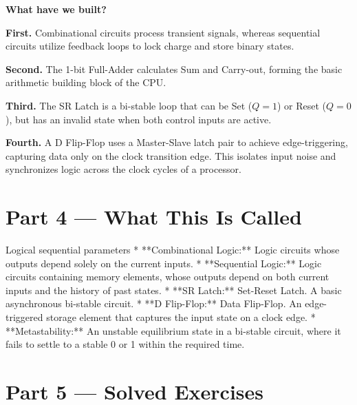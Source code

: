 \documentclass[12pt, a4paper]{book}
\begin{document}
\begin{discoverybox}
\textbf{What have we built?}

\textbf{First.} Combinational circuits process transient signals, whereas sequential circuits utilize feedback loops to lock charge and store binary states.

\textbf{Second.} The 1-bit Full-Adder calculates Sum and Carry-out, forming the basic arithmetic building block of the CPU.

\textbf{Third.} The SR Latch is a bi-stable loop that can be Set ($Q=1$) or Reset ($Q=0$), but has an invalid state when both control inputs are active.

\textbf{Fourth.} A D Flip-Flop uses a Master-Slave latch pair to achieve edge-triggering, capturing data only on the clock transition edge. This isolates input noise and synchronizes logic across the clock cycles of a processor.
\end{discoverybox}

\newpage

\section{Part 4 --- What This Is Called}

\begin{namedconcept}{Logical sequential parameters}
* **Combinational Logic:** Logic circuits whose outputs depend solely on the current inputs.
* **Sequential Logic:** Logic circuits containing memory elements, whose outputs depend on both current inputs and the history of past states.
* **SR Latch:** Set-Reset Latch. A basic asynchronous bi-stable circuit.
* **D Flip-Flop:** Data Flip-Flop. An edge-triggered storage element that captures the input state on a clock edge.
* **Metastability:** An unstable equilibrium state in a bi-stable circuit, where it fails to settle to a stable 0 or 1 within the required time.
\end{namedconcept}

\newpage

\section{Part 5 --- Solved Exercises}
\end{document}
